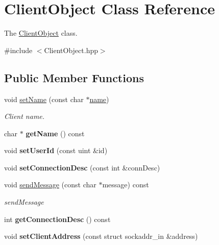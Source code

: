 \hypertarget{classClientObject}{}\section{Client\+Object Class Reference}
\label{classClientObject}


The \hyperlink{classClientObject}{Client\+Object} class.  




{\ttfamily \#include $<$Client\+Object.\+hpp$>$}

\subsection*{Public Member Functions}
\begin{DoxyCompactItemize}
\item 
\mbox{\label{classClientObject_ab91f5a41ec123f2d312c7162eda4dff4}} 
void \hyperlink{classClientObject_ab91f5a41ec123f2d312c7162eda4dff4}{set\+Name} (const char $\ast$\hyperlink{classClientObject_a29fa4c21633a35a7321e255e7ac10dbc}{name})
\begin{DoxyCompactList}\small\item\em Client name. \end{DoxyCompactList}\item 
\mbox{\label{classClientObject_a5c4daa9636097bf2905dc53ad08ca81c}} 
char $\ast$ {\bfseries get\+Name} () const
\item 
\mbox{\label{classClientObject_a91713ffa31ed38978f10139dc2ddb81f}} 
void {\bfseries set\+User\+Id} (const uint \&id)
\item 
\mbox{\label{classClientObject_a6cc23f4c8d93b2945399a7c5c0af7501}} 
void {\bfseries set\+Connection\+Desc} (const int \&conn\+Desc)
\item 
void \hyperlink{classClientObject_a4704430f61bd85efd980c6ea083d5374}{send\+Message} (const char $\ast$message) const
\begin{DoxyCompactList}\small\item\em send\+Message \end{DoxyCompactList}\item 
\mbox{\label{classClientObject_a005f6a32946b325538add475a3245761}} 
int {\bfseries get\+Connection\+Desc} () const
\item 
\mbox{\label{classClientObject_a49c720a1b38e12ebad46f2e9c9cde1b1}} 
void {\bfseries set\+Client\+Address} (const struct sockaddr\+\_\+in \&address)
\end{DoxyCompactItemize}
